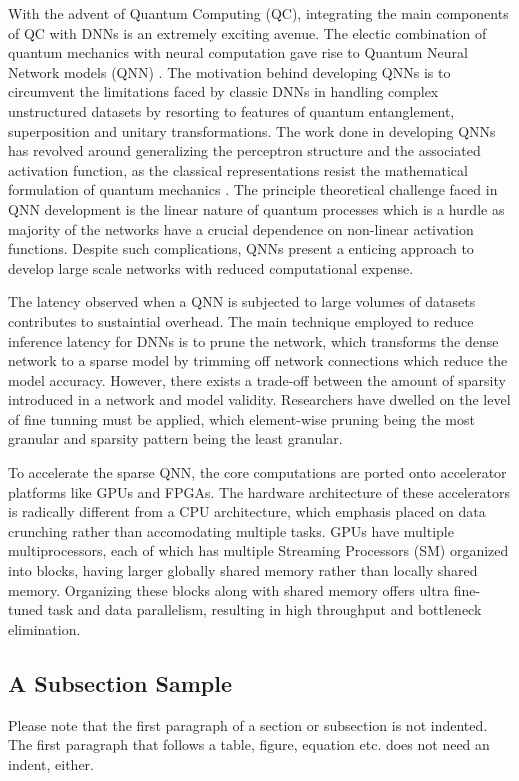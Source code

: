 \documentclass[runningheads]{llncs}
\begin{document}
With the advent of Quantum Computing (QC), integrating the main components of QC with DNNs is an extremely exciting avenue. The electic combination of quantum mechanics with neural computation gave rise to Quantum Neural Network models (QNN) \cite{Kak} \cite{Chrisley}. The motivation behind developing QNNs is to circumvent the limitations faced by classic DNNs in handling complex unstructured datasets by resorting to features of quantum entanglement, superposition and unitary transformations. The work done in developing QNNs has revolved around generalizing the perceptron structure and the associated activation function, as the classical representations resist the mathematical formulation of quantum mechanics \cite{steck}. The principle theoretical challenge faced in QNN development is the linear nature of quantum processes which is a hurdle as majority of the networks have a crucial dependence on non-linear activation functions. Despite such complications, QNNs present a enticing approach to develop large scale networks with reduced computational expense.

The latency observed when a QNN is subjected to large volumes of datasets contributes to sustaintial overhead. The main technique employed to reduce inference latency for DNNs is to prune the network, which transforms the dense network to a sparse model by trimming off network connections which reduce the model accuracy. However, there exists a trade-off between the amount of sparsity introduced in a network and model validity. Researchers have dwelled on the level of fine tunning must be applied, which element-wise pruning\cite{Han} being the most granular and sparsity pattern being the least granular\cite{Han2}.    

To accelerate the sparse QNN, the core computations are ported onto accelerator platforms like GPUs and FPGAs. The hardware architecture of these accelerators is radically different from a CPU architecture, which emphasis placed on data crunching rather than accomodating multiple tasks.  GPUs have multiple multiprocessors, each of which has multiple Streaming Processors (SM) organized into blocks, having larger globally shared memory rather than locally shared memory. Organizing these blocks along with shared memory offers ultra fine-tuned task and data parallelism, resulting in high throughput and bottleneck elimination.   
\subsection{A Subsection Sample}
Please note that the first paragraph of a section or subsection is
not indented. The first paragraph that follows a table, figure,
equation etc. does not need an indent, either.
\end{document}
